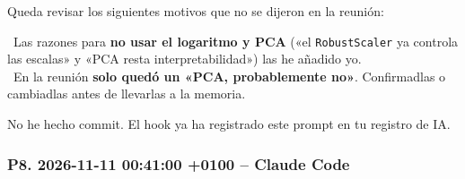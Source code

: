 \documentclass[11pt,a4paper]{article}
\begin{document}
{Queda revisar los siguientes motivos que no se dijeron en la reunión:

\hspace*{1.0em}\textbullet~Las razones para \textbf{no usar el logaritmo y PCA} («el \texttt{RobustScaler} ya controla las escalas» y «PCA resta interpretabilidad») las he añadido yo.  \\{}
\hspace*{1.0em}\textbullet~En la reunión \textbf{solo quedó un «PCA, probablemente no»}. Confirmadlas o cambiadlas antes de llevarlas a la memoria.

No he hecho commit. El hook ya ha registrado este prompt en tu registro de IA.

}

\subsubsection*{P8. 2026-11-11 00:41:00 +0100 -- Claude Code}
\end{document}
